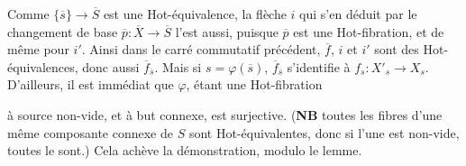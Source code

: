 
Comme $\{\overline{s}\} \longrightarrow \overline{S}$ est une Hot-équivalence, la flèche $i$ qui s'en déduit par le changement de base $\overline{p} : \overline{X} \longrightarrow \overline{S}$ l'est aussi, puisque $\overline{p}$ est une Hot-fibration, et de même pour $i'$. Ainsi dans le carré commutatif précédent, $\overline{f}$, $i$ et $i'$ sont des Hot-équivalences, donc aussi $\overline{f}_{\overline{s}}$. Mais si $s = \varphi(\overline{s})$, $\overline{f}_{\overline{s}}$ s'identifie à $f_s : X'_s \longrightarrow X_s$. D'ailleurs, il est immédiat que $\varphi$, étant une Hot-fibration


à source non-vide, et à but connexe, est surjective. (\textbf{NB} toutes les fibres d'une même composante connexe de $S$ sont Hot-équivalentes, donc si l'une est non-vide, toutes le sont.) Cela achève la démonstration, modulo le lemme.

